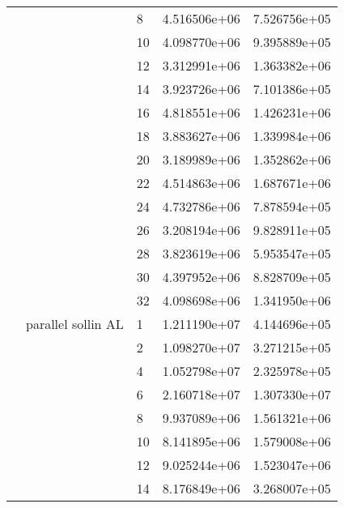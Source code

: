\begin{tabular}{lllrr}
                      &                     & 8  &  4.516506e+06 &  7.526756e+05 \\
                      &                     & 10 &  4.098770e+06 &  9.395889e+05 \\
                      &                     & 12 &  3.312991e+06 &  1.363382e+06 \\
                      &                     & 14 &  3.923726e+06 &  7.101386e+05 \\
                      &                     & 16 &  4.818551e+06 &  1.426231e+06 \\
                      &                     & 18 &  3.883627e+06 &  1.339984e+06 \\
                      &                     & 20 &  3.189989e+06 &  1.352862e+06 \\
                      &                     & 22 &  4.514863e+06 &  1.687671e+06 \\
                      &                     & 24 &  4.732786e+06 &  7.878594e+05 \\
                      &                     & 26 &  3.208194e+06 &  9.828911e+05 \\
                      &                     & 28 &  3.823619e+06 &  5.953547e+05 \\
                      &                     & 30 &  4.397952e+06 &  8.828709e+05 \\
                      &                     & 32 &  4.098698e+06 &  1.341950e+06 \\
                      & parallel sollin AL & 1  &  1.211190e+07 &  4.144696e+05 \\
                      &                     & 2  &  1.098270e+07 &  3.271215e+05 \\
                      &                     & 4  &  1.052798e+07 &  2.325978e+05 \\
                      &                     & 6  &  2.160718e+07 &  1.307330e+07 \\
                      &                     & 8  &  9.937089e+06 &  1.561321e+06 \\
                      &                     & 10 &  8.141895e+06 &  1.579008e+06 \\
                      &                     & 12 &  9.025244e+06 &  1.523047e+06 \\
                      &                     & 14 &  8.176849e+06 &  3.268007e+05 \\

\end{tabular}
